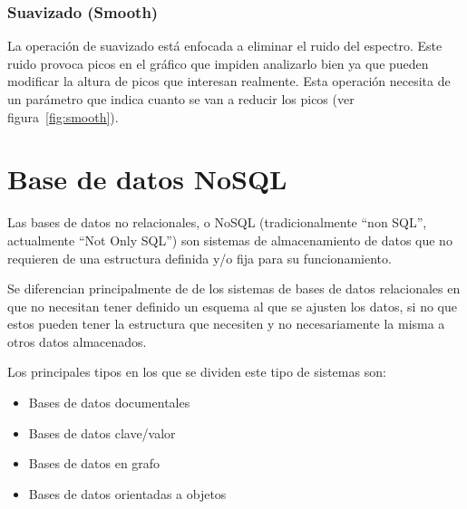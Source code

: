 \subsubsection{Suavizado (Smooth)}

La operación de suavizado está enfocada a eliminar el ruido del espectro. Este
ruido provoca picos en el gráfico que impiden analizarlo bien ya que 
pueden modificar la altura de picos que interesan realmente. Esta operación
necesita de un parámetro que indica cuanto se van a reducir los picos (ver
figura~\ref{fig:smooth}).


\section{Base de datos NoSQL}

Las bases de datos no relacionales, o NoSQL (tradicionalmente ``non SQL'',
actualmente ``Not Only SQL'')\cite{wiki:nosql} son sistemas de almacenamiento de
datos que no requieren de una estructura definida y/o fija para su
funcionamiento.

Se diferencian principalmente de de los sistemas de bases de datos relacionales
en que no necesitan tener definido un esquema al que se ajusten los datos, si no
que estos pueden tener la estructura que necesiten y no necesariamente la misma
a otros datos almacenados.

Los principales tipos en los que se dividen este tipo de sistemas son:
\begin{itemize}
	\item Bases de datos documentales
	\item Bases de datos clave/valor
	\item Bases de datos en grafo
	\item Bases de datos orientadas a objetos
\end{itemize}

